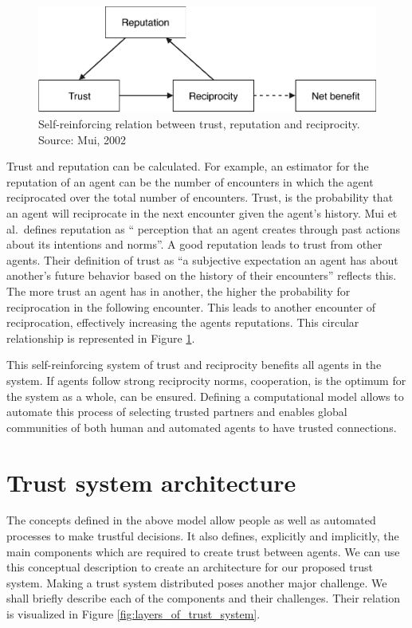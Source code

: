 \begin{figure}[h!]
    \centering
    \includegraphics[width=\textwidth]{images/mui_figure.pdf}
    \caption{Self-reinforcing relation between trust, reputation and reciprocity. Source: Mui, 2002~\cite{mui2002computational}}
    \label{fig:mui}
\end{figure}

Trust and reputation can be calculated. For example, an estimator for the reputation
of an agent can be the number of encounters in which the agent reciprocated over the total number of 
encounters. Trust, is the probability that an agent will reciprocate in the next encounter given 
the agent's history. Mui et al.\ defines reputation as ``
perception that an agent creates through past actions about its intentions and norms''. A good 
reputation leads to trust from other agents. Their definition of trust as ``a subjective expectation
an agent has about another's future behavior based on the history of their encounters'' reflects
this. The more trust an agent has in another, the higher the probability for reciprocation in the following
encounter. This leads to another encounter of reciprocation, effectively increasing the agents 
reputations. This circular relationship is represented in Figure \ref{fig:mui}. 


This self-reinforcing system of trust and reciprocity benefits all agents in the system. If agents
follow strong reciprocity norms, cooperation, is the optimum for the system as a whole, can be ensured.
Defining a computational model allows to automate this process of selecting trusted partners
and enables global communities of both human and automated agents to have trusted connections.

\section{Trust system architecture}
The concepts defined in the above model allow people as well as automated processes to make 
trustful decisions. It also defines, explicitly and implicitly, the main components which are 
required to create trust between agents. We can use this conceptual description to create an 
architecture for our proposed trust system. Making a trust system distributed poses another major 
challenge. We shall briefly describe each of the components and their challenges. Their relation is
visualized in Figure \ref{fig:layers_of_trust_system}.

